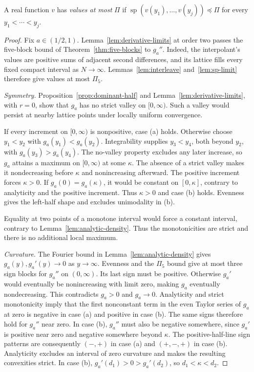 A real function $v$ has \emph{values at most} $\Pi$ if
$\operatorname{sp}(v(y_1),\ldots,v(y_j))\preceq\Pi$ for every
$y_1<\cdots<y_j$.

\begin{proof}
Fix $a\in(1/2,1)$. Lemma~\ref{lem:derivative-limits} at order two
passes the five-block bound of Theorem~\ref{thm:five-blocks} to
$g_a''$. Indeed, the interpolant's values are positive sums of
adjacent second differences, and its lattice fills every fixed
compact interval as $N\to\infty$. Lemmas~\ref{lem:interleave}
and~\ref{lem:sp-limit} therefore give values at most $\Pi_5$.


\emph{Symmetry.} Proposition~\ref{prop:dominant-half} and
Lemma~\ref{lem:derivative-limits}, with $r=0$, show that $g_a$
has no strict valley on $[0,\infty)$. Such a valley would persist
at nearby lattice points under locally uniform convergence.

If every increment on $[0,\infty)$ is nonpositive, case (a)
holds. Otherwise choose $y_1<y_2$ with $g_a(y_1)<g_a(y_2)$.
Integrability supplies $y_3<y_4$, both beyond $y_2$, with
$g_a(y_3)>g_a(y_4)$. The no-valley property excludes any later increase,
so $g_a$ attains a maximum on $[0,\infty)$ at some $\kappa$.
The absence of a strict valley makes it nondecreasing before
$\kappa$ and nonincreasing afterward. The positive increment forces
$\kappa>0$. If $g_a(0)=g_a(\kappa)$,
it would be constant on $[0,\kappa]$, contrary to analyticity
and the positive increment. Thus $\kappa>0$ and case (b) holds.
Evenness gives the left-half shape and excludes unimodality in (b).

Equality at two points of a monotone interval would force a constant
interval, contrary to Lemma~\ref{lem:analytic-density}. Thus the
monotonicities are strict and there is no additional local maximum.

\emph{Curvature.} The Fourier bound in
Lemma~\ref{lem:analytic-density} gives $g_a(y),g_a'(y)\to0$ as
$y\to\infty$. Evenness and the $\Pi_5$ bound give at most three sign
blocks for $g_a''$ on $(0,\infty)$. Its last sign must be positive. Otherwise $g_a'$ would eventually
be nonincreasing with limit zero, making $g_a$ eventually nondecreasing.
This contradicts $g_a>0$ and $g_a\to0$.
Analyticity and strict monotonicity imply that the first nonconstant
term in the even Taylor series of $g_a$ at zero is negative in case (a)
and positive in case (b). The same signs therefore hold for $g_a''$
near zero. In case (b), $g_a''$ must also be negative somewhere, since
$g_a'$ is positive near zero and negative somewhere beyond $\kappa$.
The positive-half-line sign patterns are consequently $(-,+)$ in
case (a) and $(+,-,+)$ in case (b). Analyticity excludes an interval
of zero curvature and makes the resulting convexities strict. In
case (b), $g_a'(d_1)>0>g_a'(d_2)$, so $d_1<\kappa<d_2$.
\end{proof}

